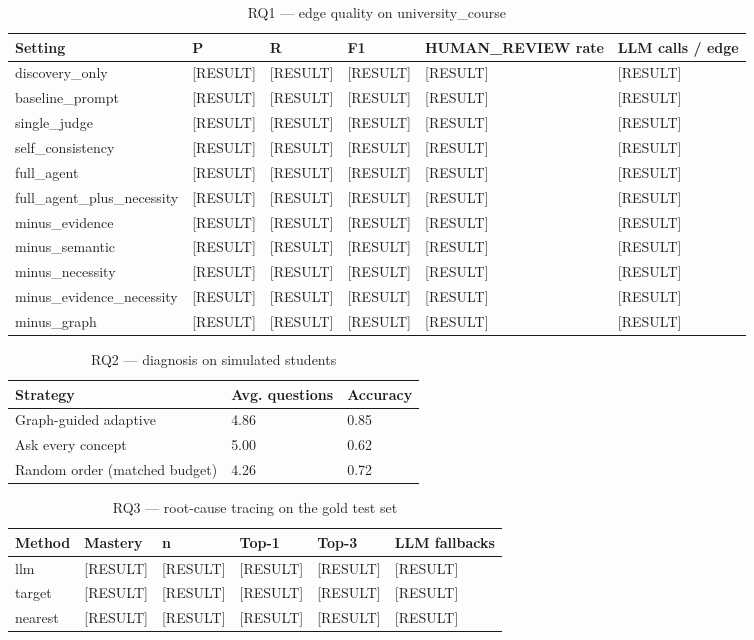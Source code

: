 \begin{table}[t]
\centering
\caption{RQ1 --- edge quality on university\_course}
\label{tab:rq1_university_course}
\small
\begin{tabular}{llllll}
\toprule
Setting & P & R & F1 & HUMAN\_REVIEW rate & LLM calls / edge \\
\midrule
discovery\_only & [RESULT] & [RESULT] & [RESULT] & [RESULT] & [RESULT] \\
baseline\_prompt & [RESULT] & [RESULT] & [RESULT] & [RESULT] & [RESULT] \\
single\_judge & [RESULT] & [RESULT] & [RESULT] & [RESULT] & [RESULT] \\
self\_consistency & [RESULT] & [RESULT] & [RESULT] & [RESULT] & [RESULT] \\
full\_agent & [RESULT] & [RESULT] & [RESULT] & [RESULT] & [RESULT] \\
full\_agent\_plus\_necessity & [RESULT] & [RESULT] & [RESULT] & [RESULT] & [RESULT] \\
minus\_evidence & [RESULT] & [RESULT] & [RESULT] & [RESULT] & [RESULT] \\
minus\_semantic & [RESULT] & [RESULT] & [RESULT] & [RESULT] & [RESULT] \\
minus\_necessity & [RESULT] & [RESULT] & [RESULT] & [RESULT] & [RESULT] \\
minus\_evidence\_necessity & [RESULT] & [RESULT] & [RESULT] & [RESULT] & [RESULT] \\
minus\_graph & [RESULT] & [RESULT] & [RESULT] & [RESULT] & [RESULT] \\
\bottomrule
\end{tabular}
\end{table}

\begin{table}[t]
\centering
\caption{RQ2 --- diagnosis on simulated students}
\label{tab:rq2}
\small
\begin{tabular}{lll}
\toprule
Strategy & Avg. questions & Accuracy \\
\midrule
Graph-guided adaptive & 4.86 & 0.85 \\
Ask every concept & 5.00 & 0.62 \\
Random order (matched budget) & 4.26 & 0.72 \\
\bottomrule
\end{tabular}
\end{table}

\begin{table}[t]
\centering
\caption{RQ3 --- root-cause tracing on the gold test set}
\label{tab:rq3}
\small
\begin{tabular}{llllll}
\toprule
Method & Mastery & n & Top-1 & Top-3 & LLM fallbacks \\
\midrule
llm & [RESULT] & [RESULT] & [RESULT] & [RESULT] & [RESULT] \\
target & [RESULT] & [RESULT] & [RESULT] & [RESULT] & [RESULT] \\
nearest & [RESULT] & [RESULT] & [RESULT] & [RESULT] & [RESULT] \\
\bottomrule
\end{tabular}
\end{table}

